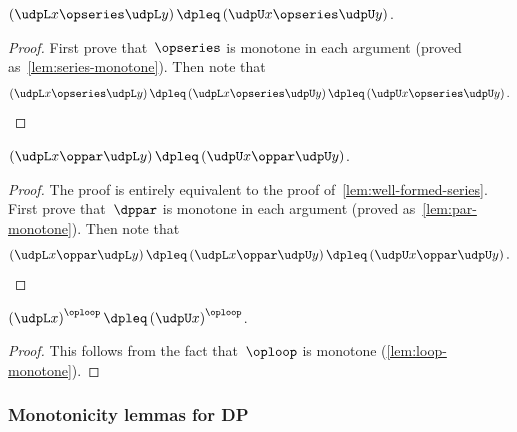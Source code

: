 \begin{lemma}
\label{lem:well-formed-series}$\left(\udpL x\opseries\udpL y\right)\dpleq\left(\udpU x\opseries\udpU y\right)$.
\end{lemma}
\begin{proof}
First prove that~$\opseries$ is monotone in each argument (proved
as~\cref{lem:series-monotone}). Then note that
\[
\left(\udpL x\opseries\udpL y\right)\dpleq\left(\udpL x\opseries\udpU y\right)\dpleq\left(\udpU x\opseries\udpU y\right).
\]
\end{proof}
\begin{lemma}
\label{lem:well-formed-par}$\left(\udpL x\oppar\udpL y\right)\dpleq\left(\udpU x\oppar\udpU y\right)$.
\end{lemma}
\begin{proof}
The proof is entirely equivalent to the proof of~\cref{lem:well-formed-series}.
First prove that~$\dppar$ is monotone in each argument (proved as~\cref{lem:par-monotone}).
Then note that~
\[
\left(\udpL x\oppar\udpL y\right)\dpleq\left(\udpL x\oppar\udpU y\right)\dpleq\left(\udpU x\oppar\udpU y\right).
\]
\end{proof}

\begin{lemma}
\label{lem:well-formed-loop}$\left(\udpL x\right)^{\oploop}\dpleq\left(\udpU x\right)^{\oploop}$.
\end{lemma}
\begin{proof}
This follows from the fact that~$\oploop$ is monotone (\cref{lem:loop-monotone}).
\end{proof}


\subsubsection{Monotonicity lemmas for DP}

